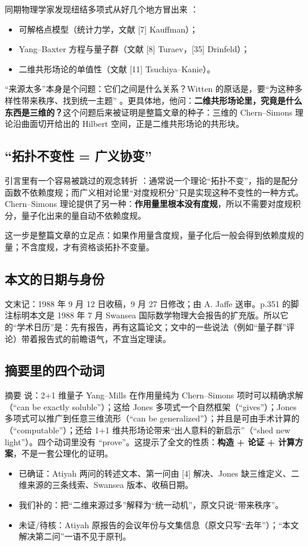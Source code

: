 同期物理学家发现纽结多项式从好几个地方冒出来 ：
\begin{itemize}[leftmargin=1.6em]
\item 可解格点模型（统计力学，文献 [7] Kauffman）；
\item Yang--Baxter 方程与量子群（文献 [8] Turaev，[35] Drinfeld）；
\item 二维共形场论的单值性（文献 [11] Tsuchiya--Kanie）。
\end{itemize}

“来源太多”本身是个问题：它们之间是什么关系？Witten 的原话是，要“为这种多样性带来秩序、找到统一主题” 。更具体地，他问：\textbf{二维共形场论里，究竟是什么东西是三维的？}这个问题后来被证明是整篇文章的种子：三维的 Chern--Simons 理论沿曲面切开给出的 Hilbert 空间，正是二维共形场论的共形块。

\subsection{“拓扑不变性 = 广义协变”}

引言里有一个容易被跳过的观念转折 ：通常说一个理论“拓扑不变”，指的是配分函数不依赖度规；而广义相对论里“对度规积分”只是实现这种不变性的一种方式。Chern--Simons 理论提供了另一种：\textbf{作用量里根本没有度规}，所以不需要对度规积分，量子化出来的量自动不依赖度规。

这一步是整篇文章的立足点：如果作用量含度规，量子化后一般会得到依赖度规的量；不含度规，才有资格谈拓扑不变量。

\subsection{本文的日期与身份}

文末记：1988 年 9 月 12 日收稿，9 月 27 日修改；由 A. Jaffe 送审。p.351 的脚注标明本文是 1988 年 7 月 Swansea 国际数学物理大会报告的扩充版。所以它的“学术日历”是：先有报告，再有这篇论文；文中的一些说法（例如“量子群”评论）带着报告式的前瞻语气，不宜当定理读。

\subsection{摘要里的四个动词}

摘要  说：2+1 维量子 Yang--Mills 在作用量纯为 Chern--Simons 项时可以精确求解（“can be exactly soluble”）；这给 Jones 多项式一个自然框架（“gives”）；Jones 多项式可以推广到任意三维流形（“can be generalized”）；并且是可由手术计算的（“computable”）；还给 1+1 维共形场论带来“出人意料的新启示”（“shed new light”）。四个动词里没有 “prove”。这提示了全文的性质：\textbf{构造 + 论证 + 计算方案}，不是一套公理化的证明。

\begin{boundary}
\begin{itemize}[leftmargin=1.4em]
\item 已确证：Atiyah 两问的转述文本、第一问由 [4] 解决、Jones 缺三维定义、二维来源的三条线索、Swansea 版本、收稿日期。
\item 我们补的：把“二维来源过多”解释为“统一动机”，原文只说“带来秩序”。
\item 未证/待核：Atiyah 原报告的会议年份与文集信息（原文只写“去年”）；“本文解决第二问”一语不见于原刊。
\end{itemize}
\end{boundary}
